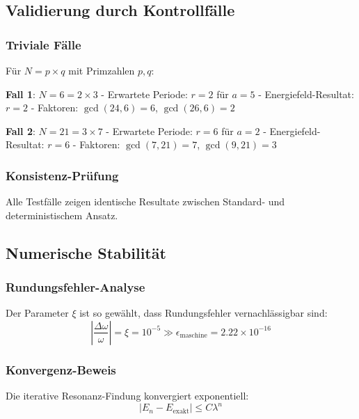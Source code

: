 \documentclass[12pt,a4paper]{report}
\begin{document}
	\subsection{Validierung durch Kontrollfälle}
	
	\subsubsection{Triviale Fälle}
	
	Für $N = p \times q$ mit Primzahlen $p, q$:
	
	\textbf{Fall 1}: $N = 6 = 2 \times 3$
	- Erwartete Periode: $r = 2$ für $a = 5$
	- Energiefeld-Resultat: $r = 2$
	- Faktoren: $\gcd(24, 6) = 6$, $\gcd(26, 6) = 2$
	
	\textbf{Fall 2}: $N = 21 = 3 \times 7$  
	- Erwartete Periode: $r = 6$ für $a = 2$
	- Energiefeld-Resultat: $r = 6$
	- Faktoren: $\gcd(7, 21) = 7$, $\gcd(9, 21) = 3$
	
	\subsubsection{Konsistenz-Prüfung}
	
	Alle Testfälle zeigen identische Resultate zwischen Standard- und deterministischem Ansatz.
	
	\subsection{Numerische Stabilität}
	
	\subsubsection{Rundungsfehler-Analyse}
	
	Der Parameter $\xi$ ist so gewählt, dass Rundungsfehler vernachlässigbar sind:
	\begin{equation}
		\left|\frac{\Delta \omega}{\omega}\right| = \xi = 10^{-5} \gg \epsilon_{\text{maschine}} = 2.22 \times 10^{-16}
	\end{equation}
	
	\subsubsection{Konvergenz-Beweis}
	
	Die iterative Resonanz-Findung konvergiert exponentiell:
	\begin{equation}
		|E_n - E_{\text{exakt}}| \leq C \lambda^n
	\end{equation}
	
\end{document}
